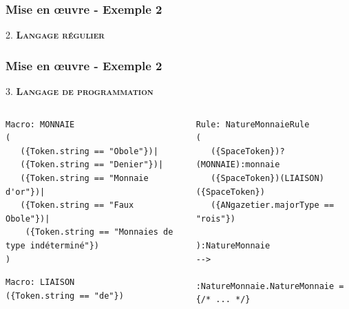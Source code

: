 \documentclass[10pt, compress]{beamer}
\begin{document}
\begin{frame}[fragile,t]
  \frametitle{Mise en œuvre - Exemple 2}
\begin{center}
\end{center}
2. \textbf{\textsc{\textbf{Langage régulier}}}\\
\begin{scriptsize}
 
\end{scriptsize}

\end{frame}

\begin{frame}[fragile,t]
  \frametitle{Mise en œuvre - Exemple 2}
\begin{center}
 
\end{center}
3. \textbf{\textsc{\textbf{Langage de programmation}}}\\
\begin{columns}[t]
  \begin{column}{.5\linewidth}
\begin{lstlisting}
Macro: MONNAIE
(
   ({Token.string == "Obole"})|
   ({Token.string == "Denier"})|
   ({Token.string == "Monnaie d'or"})|
   ({Token.string == "Faux Obole"})|
    ({Token.string == "Monnaies de type indéterminé"})
)
\end{lstlisting}
\begin{lstlisting}
Macro: LIAISON
({Token.string == "de"})
\end{lstlisting}
\end{column}


\begin{column}{.5\linewidth}
\begin{lstlisting}
Rule: NatureMonnaieRule
(   
   ({SpaceToken})?(MONNAIE):monnaie
   ({SpaceToken})(LIAISON)({SpaceToken})
   ({ANgazetier.majorType == "rois"})
   
):NatureMonnaie 
-->
      :NatureMonnaie.NatureMonnaie = {/* ... */}
\end{lstlisting}
\end{column}
\end{columns}
\end{frame}
\end{document}
